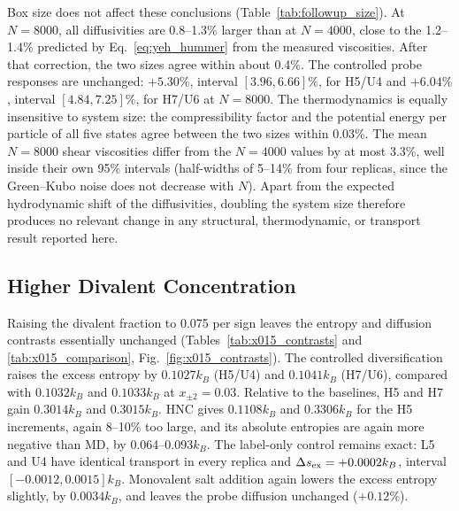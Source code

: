 \documentclass[aps,pre,twocolumn,superscriptaddress,floatfix]{revtex4-2}
\begin{document}


Box size does not affect these conclusions (Table~\ref{tab:followup_size}). At $N=8000$, all diffusivities are 0.8--1.3\% larger than at $N=4000$, close to the 1.2--1.4\% predicted by Eq.~\eqref{eq:yeh_hummer} from the measured viscosities. After that correction, the two sizes agree within about 0.4\%. The controlled probe responses are unchanged: $+5.30\%$, interval $[3.96,6.66]\%$, for H5/U4 and $+6.04\%$, interval $[4.84,7.25]\%$, for H7/U6 at $N=8000$. The thermodynamics is equally insensitive to system size: the compressibility factor and the potential energy per particle of all five states agree between the two sizes within 0.03\%. The mean $N=8000$ shear viscosities differ from the $N=4000$ values by at most 3.3\%, well inside their own 95\% intervals (half-widths of 5--14\% from four replicas, since the Green--Kubo noise does not decrease with $N$). Apart from the expected hydrodynamic shift of the diffusivities, doubling the system size therefore produces no relevant change in any structural, thermodynamic, or transport result reported here.



\subsection{Higher Divalent Concentration}
\label{sec:x015_results}

Raising the divalent fraction to 0.075 per sign leaves the entropy and diffusion contrasts essentially unchanged (Tables~\ref{tab:x015_contrasts} and \ref{tab:x015_comparison}, Fig.~\ref{fig:x015_contrasts}). The controlled diversification raises the excess entropy by $0.1027k_B$ (H5/U4) and $0.1041k_B$ (H7/U6), compared with $0.1032k_B$ and $0.1033k_B$ at $x_{\pm2}=0.03$. Relative to the baselines, H5 and H7 gain $0.3014k_B$ and $0.3015k_B$. HNC gives $0.1108k_B$ and $0.3306k_B$ for the H5 increments, again 8--10\% too large, and its absolute entropies are again more negative than MD, by 0.064--0.093$k_B$. The label-only control remains exact: L5 and U4 have identical transport in every replica and $\Delta s_{\rm ex}=+0.0002k_B$, interval $[-0.0012,0.0015]k_B$. Monovalent salt addition again lowers the excess entropy slightly, by $0.0034k_B$, and leaves the probe diffusion unchanged ($+0.12\%$).


\end{document}
